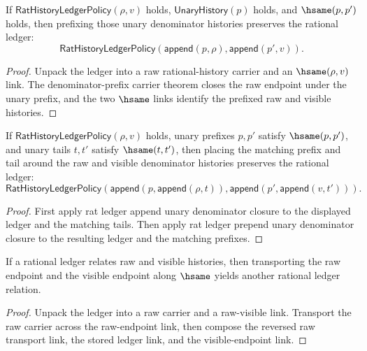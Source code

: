 \begin{theorem}
\label{thm:rat-ledger-prepend-unary-denominator-closed}
If $\mathsf{RatHistoryLedgerPolicy}(\rho,v)$ holds,
$\mathsf{UnaryHistory}(p)$ holds, and $\hsame(p,p')$ holds, then prefixing
those unary denominator histories preserves the rational ledger:
$$
\mathsf{RatHistoryLedgerPolicy}(\mathsf{append}(p,\rho),\mathsf{append}(p',v)).
$$
\end{theorem}
\begin{proof}
Unpack the ledger into a raw rational-history carrier and an $\hsame(\rho,v)$
link. The denominator-prefix carrier theorem closes the raw endpoint under the
unary prefix, and the two $\hsame$ links identify the prefixed raw and visible
histories.
\end{proof}

\begin{theorem}
\label{thm:rat-ledger-unary-denominator-context-closed}
If $\mathsf{RatHistoryLedgerPolicy}(\rho,v)$ holds, unary prefixes $p,p'$
satisfy $\hsame(p,p')$, and unary tails $t,t'$ satisfy $\hsame(t,t')$, then
placing the matching prefix and tail around the raw and visible denominator
histories preserves the rational ledger:
$$
\mathsf{RatHistoryLedgerPolicy}(\mathsf{append}(p,\mathsf{append}(\rho,t)),
\mathsf{append}(p',\mathsf{append}(v,t'))).
$$
\end{theorem}
\begin{proof}
First apply rat ledger append unary denominator closure to the displayed ledger
and the matching tails. Then apply rat ledger prepend unary denominator closure
to the resulting ledger and the matching prefixes.
\end{proof}

\begin{theorem}
\label{thm:rat-ledger-hsame-transport}
If a rational ledger relates raw and visible histories, then transporting the
raw endpoint and the visible endpoint along \(\hsame\) yields another rational
ledger relation.
\end{theorem}
\begin{proof}
Unpack the ledger into a raw carrier and a raw-visible link. Transport the raw
carrier across the raw-endpoint link, then compose the reversed raw transport
link, the stored ledger link, and the visible-endpoint link.
\end{proof}


